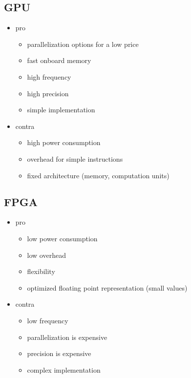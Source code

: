 \documentclass[mscthesis]{usiinfthesis}
\begin{document}
\subsection{GPU}
\begin{itemize}
    \item pro
    \begin{itemize}
        \item parallelization options for a low price
        \item fast onboard memory
        \item high frequency
        \item high precision
        \item simple implementation
    \end{itemize}
    \item contra
    \begin{itemize}
        \item high power consumption
        \item overhead for simple instructions
        \item fixed architecture (memory, computation units)
    \end{itemize}
\end{itemize}

\subsection{FPGA}
\begin{itemize}
    \item pro
    \begin{itemize}
        \item low power consumption
        \item low overhead
        \item flexibility
        \item optimized floating point representation (small values)
    \end{itemize}
    \item contra
    \begin{itemize}
        \item low frequency
        \item parallelization is expensive
        \item precision is expensive
        \item complex implementation
    \end{itemize}
\end{itemize}
\end{document}
